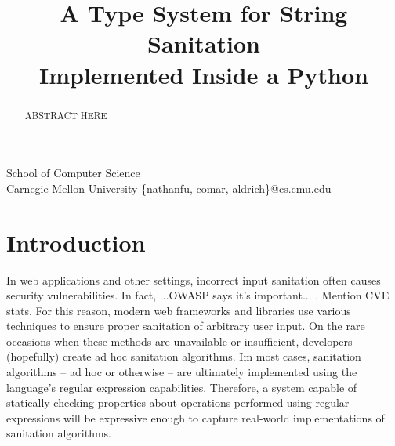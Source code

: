 \documentclass[10pt,preprint]{sigplanconf}
\theoremstyle{definition}
\begin{document}
\conferenceinfo{-}{-} 
\copyrightyear{-} 
\copyrightdata{[to be supplied]} 


\newcommand{\Ace}{\textsf{Ace}}

\title{A Type System for String Sanitation\\Implemented Inside a Python}

           {School of Computer Science\\
            Carnegie Mellon University}
           {\{nathanfu, comar, aldrich\}@cs.cmu.edu}

\maketitle
\begin{abstract}
ABSTRACT HERE
\end{abstract}

\section{Introduction}\label{intro}
In web applications and other settings, incorrect input sanitation often causes
security vulnerabilities. In fact, ...OWASP says it's important... .
Mention CVE stats.
For this reason, modern web frameworks and libraries use various techniques to
ensure proper sanitation of arbitrary user input. On the rare occasions when
these methods are unavailable or insufficient, developers (hopefully) create 
ad hoc sanitation algorithms. Im most cases, sanitation algorithms -- ad hoc 
or otherwise -- are ultimately implemented using the language's regular
expression capabilities. Therefore, a system capable of statically 
checking properties about operations performed using regular expressions will
be expressive enough to capture real-world implementations of sanitation 
algorithms.
\end{document}
